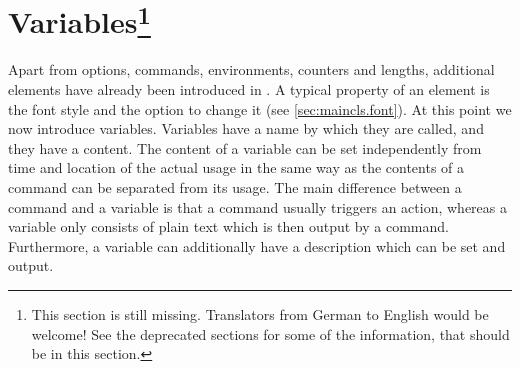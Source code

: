 \section{Variables\protect\footnote{This section is still missing. Translators
    from German to English would be welcome! See the deprecated sections for
    some of the information, that should be in this section.}}
\label{sec:scrlttr2.variables}%

Apart from options, commands, environments, counters and lengths,
additional elements have already been introduced in \KOMAScript.  A
typical property of an element is the font style and the option to
change it (see \autoref{sec:maincls.font}). At this point we now
introduce variables. Variables have a name by which they are called,
and they have a content. The content of a variable can be set
independently from time and location of the actual usage in the same
way as the contents of a command can be separated from its usage. The
main difference between a command and a variable is that a command
usually triggers an action, whereas a variable only consists of plain
text which is then output by a command. Furthermore, a variable can
additionally have a description which can be set and output.

